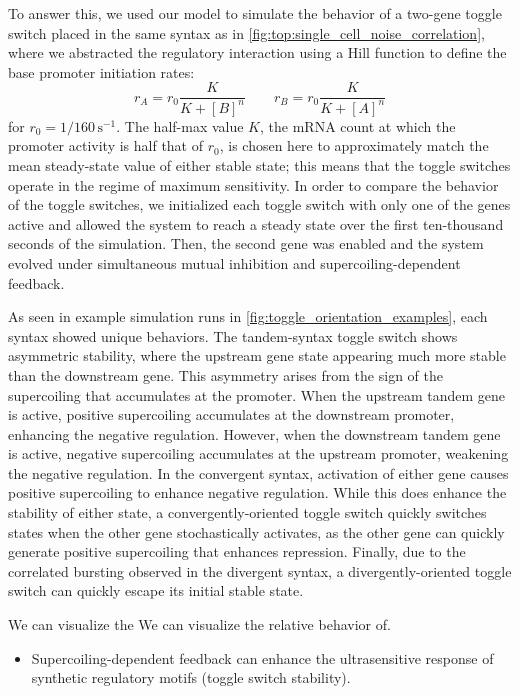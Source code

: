 \documentclass[11pt]{article}
\begin{document}
To answer this, we used our model to simulate the behavior of a two-gene toggle switch placed in the same syntax as in \cref{fig:top:single_cell_noise_correlation}, where we abstracted the regulatory interaction using a Hill function to define the base promoter initiation rates:
\begin{equation}
    r_A = r_0 \frac{K}{K + [B]^n} \qquad r_B = r_0 \frac{K}{K + [A]^n}
\end{equation}
for \(r_0 = 1/160 \,\text{s}^{-1}\). The half-max value \(K\), the mRNA count at which the promoter activity is half that of \(r_0\), is chosen here to approximately match the mean steady-state value of either stable state; this means that the toggle switches operate in the regime of maximum sensitivity. In order to compare the behavior of the toggle switches, we initialized each toggle switch with only one of the genes active and allowed the system to reach a steady state over the first ten-thousand seconds of the simulation. Then, the second gene was enabled and the system evolved under simultaneous mutual inhibition and supercoiling-dependent feedback.

As seen in example simulation runs in \cref{fig:toggle_orientation_examples}, each syntax showed unique behaviors. The tandem-syntax toggle switch shows asymmetric stability, where the upstream gene state appearing much more stable than the downstream gene. This asymmetry arises from the sign of the supercoiling that accumulates at the promoter. When the upstream tandem gene is active, positive supercoiling accumulates at the downstream promoter, enhancing the negative regulation. However, when the downstream tandem gene is active, negative supercoiling accumulates at the upstream promoter, weakening the negative regulation. In the convergent syntax, activation of either gene causes positive supercoiling to enhance negative regulation. While this does enhance the stability of either state, a convergently-oriented toggle switch quickly switches states when the other gene stochastically activates, as the other gene can quickly generate positive supercoiling that enhances repression. Finally, due to the correlated bursting observed in the divergent syntax, a divergently-oriented toggle switch can quickly escape its initial stable state.

We can visualize the
We can visualize the relative behavior of.


\begin{itemize}
\item Supercoiling-dependent feedback can enhance the ultrasensitive response of synthetic regulatory motifs (toggle switch stability).
\end{itemize}
\end{document}
